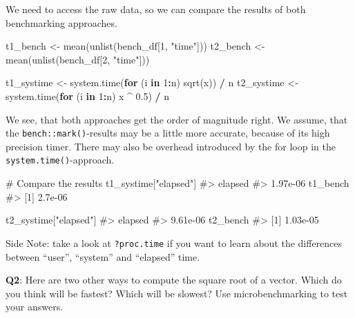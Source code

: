 \documentclass[
]{krantz}
\makeatletter
\newenvironment{Shaded}{\begin{snugshade}}{\end{snugshade}}
\newcommand{\CommentTok}[1]{\textcolor[rgb]{0.56,0.35,0.01}{\textit{#1}}}
\newcommand{\ControlFlowTok}[1]{\textcolor[rgb]{0.13,0.29,0.53}{\textbf{#1}}}
\newcommand{\DecValTok}[1]{\textcolor[rgb]{0.00,0.00,0.81}{#1}}
\newcommand{\FloatTok}[1]{\textcolor[rgb]{0.00,0.00,0.81}{#1}}
\newcommand{\KeywordTok}[1]{\textcolor[rgb]{0.13,0.29,0.53}{\textbf{#1}}}
\newcommand{\NormalTok}[1]{#1}
\newcommand{\OperatorTok}[1]{\textcolor[rgb]{0.81,0.36,0.00}{\textbf{#1}}}
\newcommand{\StringTok}[1]{\textcolor[rgb]{0.31,0.60,0.02}{#1}}
\newenvironment{kframe}{%
\medskip{}
\setlength{\fboxsep}{.8em}
 \def\at@end@of@kframe{}%
 \ifinner\ifhmode%
  \def\at@end@of@kframe{\end{minipage}}%
  \begin{minipage}{\columnwidth}%
 \fi\fi%
 \def\FrameCommand##1{\hskip\@totalleftmargin \hskip-\fboxsep
 \colorbox{shadecolor}{##1}\hskip-\fboxsep
     \hskip-\linewidth \hskip-\@totalleftmargin \hskip\columnwidth}%
 \MakeFramed {\advance\hsize-\width
   \@totalleftmargin\z@ \linewidth\hsize
   \@setminipage}}%
 {\par\unskip\endMakeFramed%
 \at@end@of@kframe}
\renewenvironment{Shaded}{\begin{kframe}}{\end{kframe}}
\renewcommand{\KeywordTok} [1]{\textcolor[rgb]{0.00,0.44,0.13}{{#1}}}
\renewcommand{\DecValTok}  [1]{\textcolor[rgb]{0.25,0.63,0.44}{{#1}}}
\renewcommand{\FloatTok}   [1]{\textcolor[rgb]{0.25,0.63,0.44}{{#1}}}
\renewcommand{\StringTok}  [1]{\textcolor[rgb]{0.25,0.44,0.63}{{#1}}}
\renewcommand{\CommentTok} [1]{\textcolor[rgb]{0.38,0.63,0.69}{{#1}}}
\renewcommand{\NormalTok}  [1]{{#1}}
\makeatother
\begin{document}
We need to access the raw data, so we can compare the results of both benchmarking approaches.

\begin{Shaded}
\begin{Highlighting}[]
\NormalTok{t1_bench <-}\StringTok{ }\KeywordTok{mean}\NormalTok{(}\KeywordTok{unlist}\NormalTok{(bench_df[}\DecValTok{1}\NormalTok{, }\StringTok{"time"}\NormalTok{]))}
\NormalTok{t2_bench <-}\StringTok{ }\KeywordTok{mean}\NormalTok{(}\KeywordTok{unlist}\NormalTok{(bench_df[}\DecValTok{2}\NormalTok{, }\StringTok{"time"}\NormalTok{]))}

\NormalTok{t1_systime <-}\StringTok{ }\KeywordTok{system.time}\NormalTok{(}\ControlFlowTok{for}\NormalTok{ (i }\ControlFlowTok{in} \DecValTok{1}\OperatorTok{:}\NormalTok{n) }\KeywordTok{sqrt}\NormalTok{(x)) }\OperatorTok{/}\StringTok{ }\NormalTok{n}
\NormalTok{t2_systime <-}\StringTok{ }\KeywordTok{system.time}\NormalTok{(}\ControlFlowTok{for}\NormalTok{ (i }\ControlFlowTok{in} \DecValTok{1}\OperatorTok{:}\NormalTok{n) x }\OperatorTok{^}\StringTok{ }\FloatTok{0.5}\NormalTok{) }\OperatorTok{/}\StringTok{ }\NormalTok{n}
\end{Highlighting}
\end{Shaded}

We see, that both approaches get the order of magnitude right. We assume, that the \texttt{bench::mark()}-results may be a little more accurate, because of its high precision timer. There may also be overhead introduced by the for loop in the \texttt{system.time()}-approach.

\begin{Shaded}
\begin{Highlighting}[]
\CommentTok{# Compare the results}
\NormalTok{t1_systime[}\StringTok{"elapsed"}\NormalTok{]}
\CommentTok{#>  elapsed }
\CommentTok{#> 1.97e-06}
\NormalTok{t1_bench}
\CommentTok{#> [1] 2.7e-06}

\NormalTok{t2_systime[}\StringTok{"elapsed"}\NormalTok{]}
\CommentTok{#>  elapsed }
\CommentTok{#> 9.61e-06}
\NormalTok{t2_bench}
\CommentTok{#> [1] 1.03e-05}
\end{Highlighting}
\end{Shaded}

Side Note: take a look at \texttt{?proc.time} if you want to learn about the differences between ``user'', ``system'' and ``elapsed'' time.

\textbf{{Q2}}: Here are two other ways to compute the square root of a vector. Which do you think will be fastest? Which will be slowest? Use microbenchmarking to test your answers.
\end{document}
